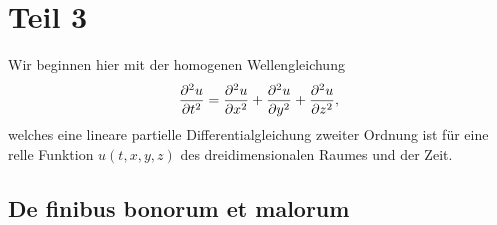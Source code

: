 %
%
%
%
\section{Teil 3
\label{ueberschall:section:teil3}}

Wir beginnen hier mit der homogenen Wellengleichung
\begin{equation}
    \frac{\partial^2u}{\partial t^2}
    =
    \frac{\partial^2u}{\partial x^2} +
    \frac{\partial^2u}{\partial y^2} +
    \frac{\partial^2u}{\partial z^2},\\
\label{ueberschall:wellengleichung}
\end{equation}
welches eine lineare partielle Differentialgleichung zweiter Ordnung ist
für eine relle Funktion $u(t,x,y,z)$ des dreidimensionalen Raumes und der Zeit.

\subsection{De finibus bonorum et malorum
\label{ueberschall:subsection:malorum}}
